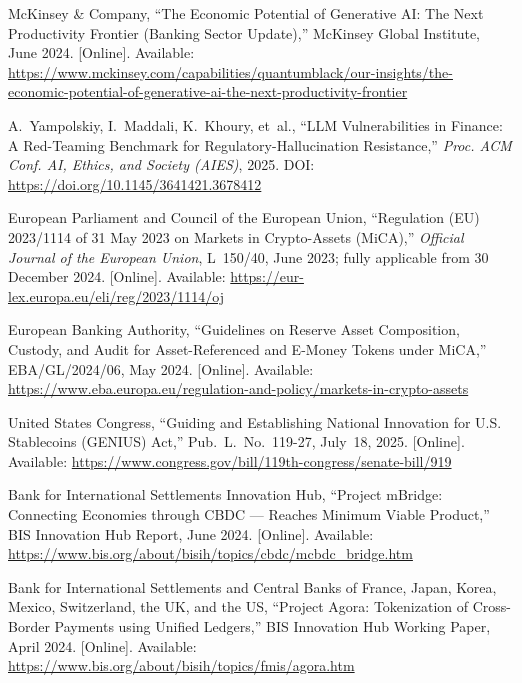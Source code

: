 \documentclass[12pt,a4paper]{report}
\begin{document}
{\begin{enumerate}[label={[\arabic*]}]
\item McKinsey \& Company, ``The Economic Potential of Generative AI: The Next Productivity Frontier (Banking Sector Update),'' McKinsey Global Institute, June 2024. [Online]. Available: \url{https://www.mckinsey.com/capabilities/quantumblack/our-insights/the-economic-potential-of-generative-ai-the-next-productivity-frontier}

\item A.~Yampolskiy, I.~Maddali, K.~Khoury, et~al., ``LLM Vulnerabilities in Finance: A Red-Teaming Benchmark for Regulatory-Hallucination Resistance,'' \textit{Proc. ACM Conf. AI, Ethics, and Society (AIES)}, 2025. DOI: \url{https://doi.org/10.1145/3641421.3678412}

\item European Parliament and Council of the European Union, ``Regulation (EU) 2023/1114 of 31 May 2023 on Markets in Crypto-Assets (MiCA),'' \textit{Official Journal of the European Union}, L~150/40, June 2023; fully applicable from 30 December 2024. [Online]. Available: \url{https://eur-lex.europa.eu/eli/reg/2023/1114/oj}

\item European Banking Authority, ``Guidelines on Reserve Asset Composition, Custody, and Audit for Asset-Referenced and E-Money Tokens under MiCA,'' EBA/GL/2024/06, May 2024. [Online]. Available: \url{https://www.eba.europa.eu/regulation-and-policy/markets-in-crypto-assets}

\item United States Congress, ``Guiding and Establishing National Innovation for U.S. Stablecoins (GENIUS) Act,'' Pub.~L.~No.~119-27, July~18, 2025. [Online]. Available: \url{https://www.congress.gov/bill/119th-congress/senate-bill/919}

\item Bank for International Settlements Innovation Hub, ``Project mBridge: Connecting Economies through CBDC --- Reaches Minimum Viable Product,'' BIS Innovation Hub Report, June 2024. [Online]. Available: \url{https://www.bis.org/about/bisih/topics/cbdc/mcbdc_bridge.htm}

\item Bank for International Settlements and Central Banks of France, Japan, Korea, Mexico, Switzerland, the UK, and the US, ``Project Agora: Tokenization of Cross-Border Payments using Unified Ledgers,'' BIS Innovation Hub Working Paper, April 2024. [Online]. Available: \url{https://www.bis.org/about/bisih/topics/fmis/agora.htm}


\end{enumerate}}
\end{document}
